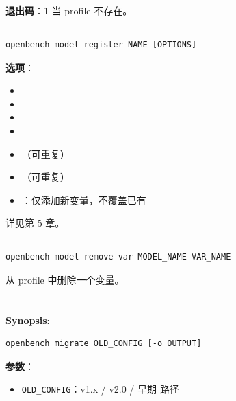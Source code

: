 \textbf{退出码}：1 当 profile 不存在。

\subsection{}

\begin{verbatim}
openbench model register NAME [OPTIONS]
\end{verbatim}

\textbf{选项}：

\begin{itemize}
  \item {}
  \item {}
  \item {}
  \item {}
  \item {}（可重复）
  \item {}（可重复）
  \item {}：仅添加新变量，不覆盖已有
\end{itemize}

详见第 5 章。

\subsection{}

\begin{verbatim}
openbench model remove-var MODEL_NAME VAR_NAME
\end{verbatim}

从 profile 中删除一个变量。

\section{}

\textbf{Synopsis}:

\begin{verbatim}
openbench migrate OLD_CONFIG [-o OUTPUT]
\end{verbatim}

\textbf{参数}：

\begin{itemize}
  \item \texttt{OLD\_CONFIG}：v1.x  / v2.0  / 早期  路径
\end{itemize}

